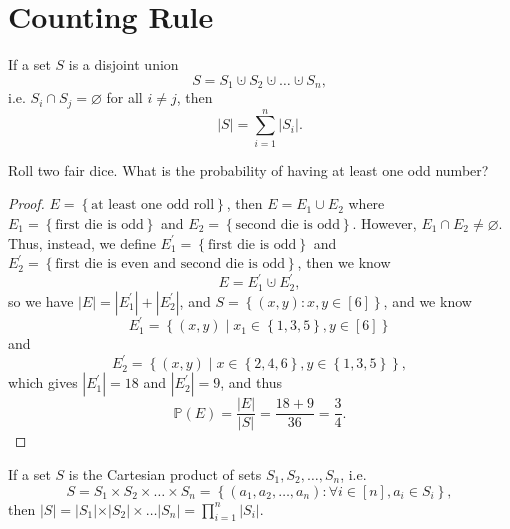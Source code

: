\section{Counting Rule}

\begin{theorem}
    If a set \(S\) is a disjoint union 
    \[
        S = S_1 \cupdot S_2 \cupdot \dots \cupdot S_n,
    \] i.e. \(S_i \cap S_j = \varnothing \) for all \(i \neq j\), then 
    \[
        \vert S \vert = \sum_{i=1}^n \vert S_i \vert.   
    \]  
\end{theorem}

\begin{eg}
    Roll two fair dice. What is the probability of having at least one odd number?
\end{eg}
\begin{proof}
    \(E = \left\{ \text{at least one odd roll}  \right\} \), then \(E = E_1 \cup E_2\) where \(E_1 = \left\{ \text{first die is odd}  \right\} \) and \(E_2 = \left\{ \text{second die is odd}  \right\} \). However, \(E_1 \cap E_2 \neq \varnothing \). Thus, instead, we define \(E_1^{\prime} = \left\{ \text{first die is odd}  \right\} \) and \(E_2^{\prime} = \left\{ \text{first die is even and second die is odd}  \right\} \), then we know 
    \[
        E = E_1^{\prime} \cupdot E_2^{\prime}, 
    \]       
    so we have \(\vert E \vert = \left\vert E_1^{\prime}  \right\vert + \left\vert E_2^{\prime}  \right\vert   \), and \(S = \left\{ (x, y) : x, y \in [6] \right\} \), and we know 
    \[
        E_1^{\prime} = \left\{ (x, y) \mid x_1 \in \left\{ 1, 3, 5 \right\}, y \in \left[ 6 \right]  \right\} 
    \]  
    and 
    \[
        E_2^{\prime} = \left\{ (x, y) \mid x \in \left\{ 2, 4, 6 \right\}, y \in \left\{ 1, 3, 5 \right\}   \right\}, 
    \]
    which gives \(\left\vert E_1^{\prime}  \right\vert = 18 \) and \(\left\vert E_2^{\prime}  \right\vert = 9 \), and thus 
    \[
        \mathbb{P} (E) = \frac{\vert E \vert }{\vert S \vert } = \frac{18 + 9}{36} = \frac{3}{4}.
    \]  
\end{proof}

\begin{theorem}
    If a set \(S\) is the Cartesian product of sets \(S_1, S_2, \dots , S_n\), i.e. 
    \[
        S = S_1 \times S_2 \times \dots \times S_n = \left\{ (a_1, a_2, \dots , a_n): \forall i \in [n], a_i \in S_i \right\}, 
    \]  
    then \(\vert S \vert = \vert S_1 \vert \times \vert S_2 \vert \times \dots \vert S_n \vert = \prod _{i=1}^n \vert S_i \vert     \).
\end{theorem}

